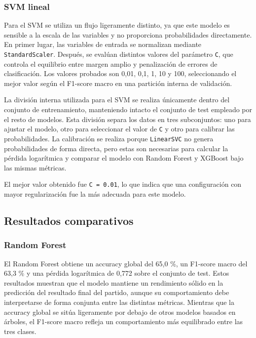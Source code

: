 \subsubsection{SVM lineal}

Para el SVM se utiliza un flujo ligeramente distinto, ya que este modelo es sensible a la escala de las variables y no proporciona probabilidades directamente. En primer lugar, las variables de entrada se normalizan mediante \texttt{StandardScaler}. Después, se evalúan distintos valores del parámetro \texttt{C}, que controla el equilibrio entre margen amplio y penalización de errores de clasificación. Los valores probados son 0,01, 0,1, 1, 10 y 100, seleccionando el mejor valor según el F1-score macro en una partición interna de validación.

La división interna utilizada para el SVM se realiza únicamente dentro del conjunto de entrenamiento, manteniendo intacto el conjunto de test empleado por el resto de modelos. Esta división separa los datos en tres subconjuntos: uno para ajustar el modelo, otro para seleccionar el valor de \texttt{C} y otro para calibrar las probabilidades. La calibración se realiza porque \texttt{LinearSVC} no genera probabilidades de forma directa, pero estas son necesarias para calcular la pérdida logarítmica y comparar el modelo con Random Forest y XGBoost bajo las mismas métricas.

El mejor valor obtenido fue \texttt{C = 0.01}, lo que indica que una configuración con mayor regularización fue la más adecuada para este modelo.

\subsection{Resultados comparativos}

\subsubsection{Random Forest}

El Random Forest obtiene un accuracy global del 65,0 \%, un F1-score macro del 63,3 \% y una pérdida logarítmica de 0,772 sobre el conjunto de test. Estos resultados muestran que el modelo mantiene un rendimiento sólido en la predicción del resultado final del partido, aunque su comportamiento debe interpretarse de forma conjunta entre las distintas métricas. Mientras que la accuracy global se sitúa ligeramente por debajo de otros modelos basados en árboles, el F1-score macro refleja un comportamiento más equilibrado entre las tres clases.

